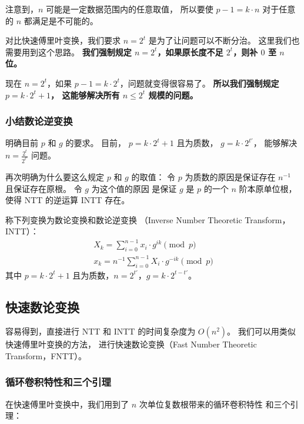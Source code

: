 \documentclass[12pt, UTF8]{article}
\begin{document}
    \bigskip
    注意到，$n$ 可能是一定数据范围内的任意取值，
    所以要使 $p - 1 = k · n$ 对于任意的 $n$ 都满足是不可能的。

    对比快速傅里叶变换，我们要求 $n = 2^t$ 是为了让问题可以不断分治。
    这里我们也需要用到这个思路。
    \textbf{我们强制规定 $n = 2^t$，如果原长度不足 $2^t$，则补 $0$ 至 $n$ 位。}

    现在 $n = 2^t$，如果 $p - 1 = k · 2^t$，问题就变得很容易了。
    \textbf{所以我们强制规定 $p = k · 2^t + 1$，
    这能够解决所有 $n \le 2^t$ 规模的问题。}

    \subsubsection{小结数论逆变换}
    明确目前 $p$ 和 $g$ 的要求。
    目前，
    $p = k · 2^t + 1$ 且为质数，
    $g = k · 2^{t'}$，
    能够解决 $n = \frac {2^t} {2^{t'}}$ 问题。

    再次明确为什么要这么规定 $p$ 和 $g$ 的取值：
    令 $p$ 为质数的原因是保证存在 $n^{-1}$
    且保证存在原根。
    令 $g$ 为这个值的原因
    是保证 $g$ 是 $p$ 的一个 $n$ 阶本原单位根，
    使得 NTT 的逆运算 INTT 存在。

    \bigskip
    称下列变换为数论变换和数论逆变换
    （Inverse Number Theoretic Transform，INTT）：
    \begin{gather*}
        X_k = \sum_{i = 0}^{n - 1} x_i · g^{ik} \pmod {p}
        \\
        x_k = n^{-1} \sum_{i = 0}^{n - 1} X_i · g^{-ik} \pmod {p}
    \end{gather*}
    其中 $p = k · 2^t + 1$ 且为质数，$n = 2^{t'}$，$g = k · 2^{t - t'}$。

    \subsection{快速数论变换}
    容易得到，直接进行 NTT 和 INTT 的时间复杂度为 $O(n^2)$。
    我们可以用类似快速傅里叶变换的方法，
    进行快速数论变换（Fast Number Theoretic Transform，FNTT）。

    \subsubsection{循环卷积特性和三个引理}
    在快速傅里叶变换中，我们用到了 $n$ 次单位复数根带来的循环卷积特性
    和三个引理：


\end{document}
